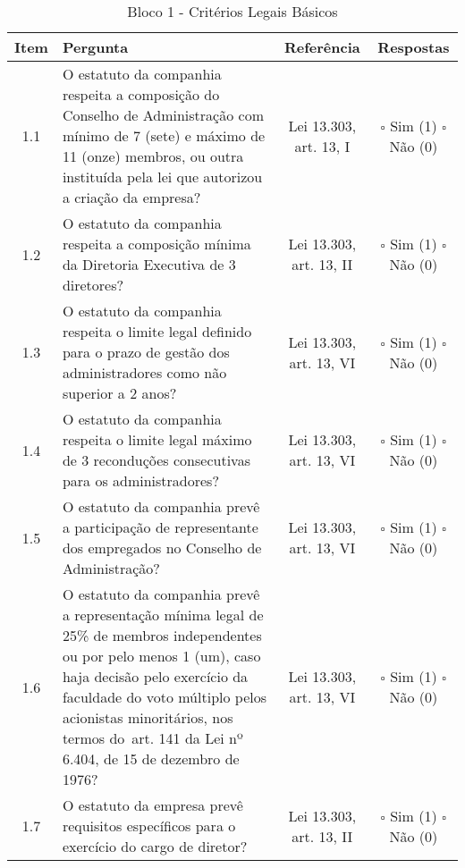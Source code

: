 \begin{center}
\begin{longtable}{c l c c}
\caption{Bloco 1 - Critérios Legais Básicos} \label{tab:dim_zero} \\
\hline
 Item & Pergunta & Referência & Respostas \\ 
 \hline
1.1  & \parbox[t]{8cm}{O estatuto da companhia respeita a composição do Conselho de Administração com mínimo de 7 (sete) e máximo de 11 (onze) membros, ou outra instituída pela lei que autorizou a criação da empresa?} & \parbox[t]{2cm}{Lei 13.303,\\ art. 13, I} & \parbox[t]{2cm}{$\square$ Sim (1) \\ $\square$ Não (0)}\\  
1.2 &\parbox[t]{8cm}{O estatuto da companhia respeita a composição mínima da Diretoria Executiva de 3 diretores?} & \parbox[t]{2cm}{Lei 13.303, art. 13, II} & \parbox[t]{2cm}{$\square$ Sim (1) \\ $\square$ Não (0)}\\ 
1.3 &\parbox[t]{8cm}{O estatuto da companhia respeita o limite legal definido para o prazo de gestão dos administradores  como não superior a 2 anos?} & \parbox[t]{2cm}{Lei 13.303, art. 13, VI} & \parbox[t]{2cm}{$\square$ Sim (1) \\ $\square$ Não (0)}\\
1.4 &\parbox[t]{8cm}{O estatuto da companhia respeita o limite legal máximo de 3 reconduções consecutivas para os administradores?} & \parbox[t]{2cm}{Lei 13.303, art. 13, VI} & \parbox[t]{2cm}{$\square$ Sim (1) \\ $\square$ Não (0)}\\ 
1.5 &\parbox[t]{8cm}{O estatuto da companhia prevê a participação de representante dos empregados no Conselho de Administração?} & \parbox[t]{2cm}{Lei 13.303, art. 13, VI} & \parbox[t]{2cm}{$\square$ Sim (1) \\ $\square$ Não (0)}\\ 
1.6 &\parbox[t]{8cm}{O estatuto da companhia prevê a representação mínima legal de 25\% de membros independentes ou por pelo menos 1 (um), caso haja decisão pelo exercício da faculdade do voto múltiplo pelos acionistas minoritários, nos termos do art. 141 da Lei nº 6.404, de 15 de dezembro de 1976?} & \parbox[t]{2cm}{Lei 13.303, art. 13, VI} & \parbox[t]{2cm}{$\square$ Sim (1) \\ $\square$ Não (0)}\\ 
1.7 &\parbox[t]{8cm}{O estatuto da empresa prevê requisitos específicos para o exercício do cargo de diretor?} & \parbox[t]{2cm}{Lei 13.303, art. 13, II} & \parbox[t]{2cm}{$\square$ Sim (1) \\ $\square$ Não (0)}\\

\end{longtable}
\end{center}
